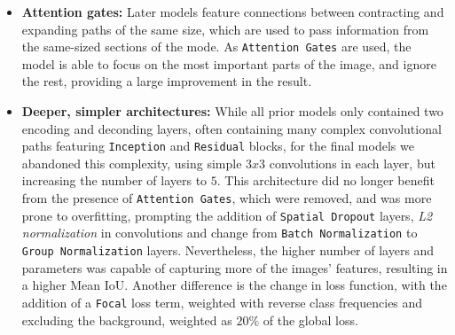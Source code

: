\documentclass[11pt]{article}
\begin{document}
\begin{multicols}{2}
\begin{itemize}[leftmargin=*]
            \item \textbf{Attention gates:} Later models feature connections between contracting and expanding paths of the same size, which are used to pass information from the same-sized sections of the mode. As \texttt{Attention Gates}\cite{oktay2018attentionunetlearninglook} are used, the model is able to focus on the most important parts of the image, and ignore the rest, providing a large improvement in the result.
            \item \textbf{Deeper, simpler architectures:} While all prior models only contained two encoding and deconding layers, often containing many complex convolutional paths featuring \texttt{Inception} and \texttt{Residual} blocks, for the final models we abandoned this complexity, using simple $3x3$ convolutions in each layer, but increasing the number of layers to $5$. This architecture did no longer benefit from the presence of \texttt{Attention Gates}, which were removed, and was more prone to overfitting, prompting the addition of \texttt{Spatial Dropout} layers, \textit{L2 normalization} in convolutions and change from \texttt{Batch Normalization} to \texttt{Group Normalization} layers. Nevertheless, the higher number of layers and parameters was capable of capturing more of the images' features, resulting in a higher Mean IoU. Another difference is the change in loss function, with the addition of a \texttt{Focal} loss term, weighted with reverse class frequencies and excluding the background, weighted as $20\%$ of the global loss.
      \end{itemize}


\end{multicols}
\end{document}
